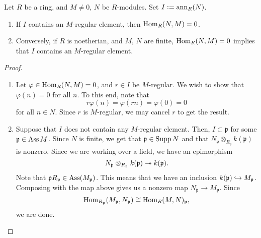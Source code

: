 \documentclass[12pt]{article}
\begin{document}
\begin{prop} \label{prop:Hom-N-M-zero-regular}
	Let $R$ be a ring, and $M \neq 0$, $N$ be $R$-modules. Set $I \vcentcolon= \operatorname{ann}_{R}(N)$.
	\begin{enumerate}[label=(\alph*)]
		\item If $I$ contains an $M$-regular element, then $\operatorname{Hom}_{R}(N, M) = 0$.
		\item Conversely, if $R$ is noetherian, and $M$, $N$ are finite, $\operatorname{Hom}_{R}(N, M) = 0$ implies that $I$ contains an $M$-regular element.
	\end{enumerate}
\end{prop}
\begin{proof} 
	\begin{enumerate}[label=(\alph*)]
		\item Let $\varphi \in \operatorname{Hom}_{R}(N, M) = 0$, and $r \in I$ be $M$-regular. We wish to show that $\varphi(n) = 0$ for all $n$. To this end, note that
		\begin{equation*} 
			r \varphi(n) = \varphi(r n) = \varphi(0) = 0
		\end{equation*}
		for all $n \in N$. Since $r$ is $M$-regular, we may cancel $r$ to get the result.
		\item Suppose that $I$ does not contain any $M$-regular element. Then, $I \subset \mathfrak{p}$ for some $\mathfrak{p} \in \operatorname{Ass} M$. Since $N$ is finite, we get that $\mathfrak{p} \in \operatorname{Supp} N$ and that $N_{\mathfrak{p}} \otimes_{R_{\mathfrak{p}}} k(\mathfrak{p})$ is nonzero. Since we are working over a field, we have an epimorphism 
		\begin{equation*} 
			N_{\mathfrak{p}} \otimes_{R_{\mathfrak{p}}} k(\mathfrak{p}) \twoheadrightarrow k(\mathfrak{p}).
		\end{equation*} 
		Note that $\mathfrak{p} R_{\mathfrak{p}} \in \operatorname{Ass}(M_{\mathfrak{p}})$. This means that we have an inclusion $k(\mathfrak{p}) \hookrightarrow M_{\mathfrak{p}}$. Composing with the map above gives us a nonzero map $N_{\mathfrak{p}} \to M_{\mathfrak{p}}$. Since
		\begin{equation*} 
			\operatorname{Hom}_{R_{\mathfrak{p}}}(M_{\mathfrak{p}}, N_{\mathfrak{p}}) \cong \operatorname{Hom}_{R}(M, N)_{\mathfrak{p}},
		\end{equation*}
		we are done. \qedhere
	\end{enumerate}
\end{proof}
\end{document}
